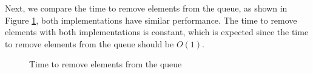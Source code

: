 \documentclass[a4paper,11pt]{article}
\begin{document}
Next, we compare the time to remove elements from the queue, as shown in Figure \ref{fig:queue_remove},
both implementations have similar performance. The time to remove elements with both implementations
is constant, which is expected since the time to remove elements from the queue should be $O(1)$.

\begin{figure}[H]
  \centering
  \caption{Time to remove elements from the queue}
  \label{fig:queue_remove}
\end{figure}
\end{document}
